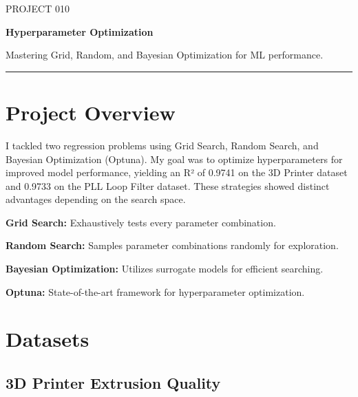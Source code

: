 \documentclass[11pt,a4paper]{article}
\begin{document}
\thispagestyle{empty}

{\colorbox{primary}{}}

\vspace{6pt}

{\fontsize{9}{11}\selectfont\color{codemuted}PROJECT 010}

\vspace{1pt}
{\fontsize{22}{27}\selectfont\bfseries\color{titleblue} Hyperparameter Optimization}

\vspace{2pt}
{\normalsize\color{accent} Mastering Grid, Random, and Bayesian Optimization for ML performance.}

\vspace{4pt}
{\color{tableheader}\rule{\linewidth}{0.4pt}}

\vspace{3pt}

\section{Project Overview}

I tackled two regression problems using Grid Search, Random Search, and Bayesian Optimization (Optuna). My goal was to optimize hyperparameters for improved model performance, yielding an R² of 0.9741 on the 3D Printer dataset and 0.9733 on the PLL Loop Filter dataset. These strategies showed distinct advantages depending on the search space.

\textbf{Grid Search:} Exhaustively tests every parameter combination.

\textbf{Random Search:} Samples parameter combinations randomly for exploration.

\textbf{Bayesian Optimization:} Utilizes surrogate models for efficient searching.

\textbf{Optuna:} State-of-the-art framework for hyperparameter optimization.


\section{Datasets}

\subsection{3D Printer Extrusion Quality}
\end{document}
